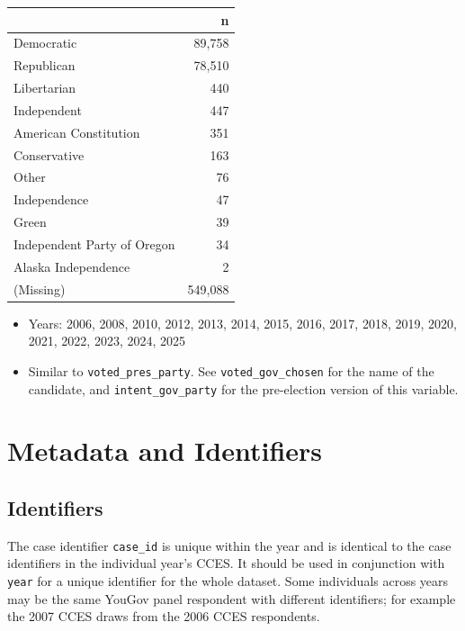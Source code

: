 \documentclass[10pt,article,oneside]{memoir}
\begin{document}
\begin{table}[H]
\centering
\begin{tabular}[t]{lr}
\toprule
 & n\\
\midrule
Democratic & 89,758\\
Republican & 78,510\\
Libertarian & 440\\
Independent & 447\\
American Constitution & 351\\
Conservative & 163\\
Other & 76\\
Independence & 47\\
Green & 39\\
Independent Party of Oregon & 34\\
Alaska Independence & 2\\
(Missing) & 549,088\\
\bottomrule
\end{tabular}
\end{table}

\begin{itemize}
\tightlist
\item
  Years: 2006, 2008, 2010, 2012, 2013, 2014, 2015, 2016, 2017, 2018,
  2019, 2020, 2021, 2022, 2023, 2024, 2025
\item
  Similar to \texttt{voted\_pres\_party}. See
  \texttt{voted\_gov\_chosen} for the name of the candidate, and
  \texttt{intent\_gov\_party} for the pre-election version of this
  variable.
\end{itemize}

\newpage

\section{Metadata and Identifiers}\label{metadata-and-identifiers}

\subsection{Identifiers}\label{identifiers}

The case identifier \texttt{case\_id} is unique within the year and is
identical to the case identifiers in the individual year's CCES. It
should be used in conjunction with \texttt{year} for a unique identifier
for the whole dataset. Some individuals across years may be the same
YouGov panel respondent with different identifiers; for example the 2007
CCES draws from the 2006 CCES respondents.
\end{document}

